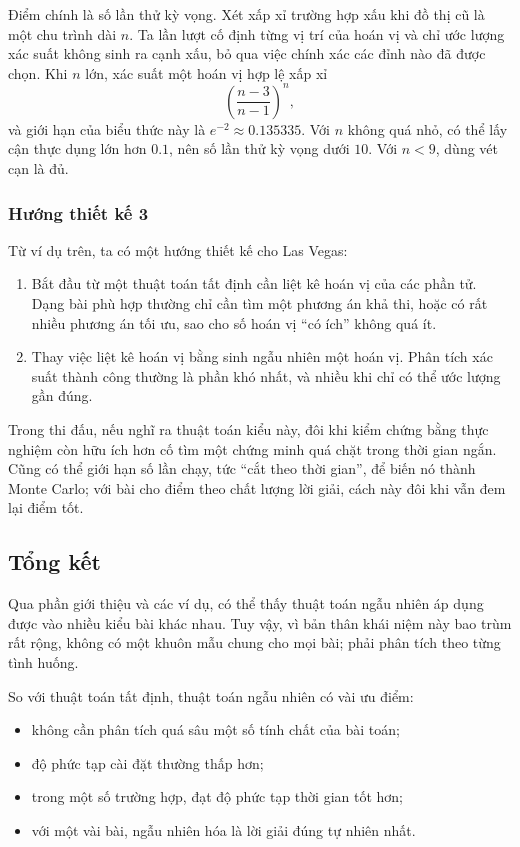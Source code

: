 \documentclass[11pt]{article}
\begin{document}
Điểm chính là số lần thử kỳ vọng. Xét xấp xỉ trường hợp xấu khi đồ thị cũ là
một chu trình dài \(n\). Ta lần lượt cố định từng vị trí của hoán vị và chỉ ước
lượng xác suất không sinh ra cạnh xấu, bỏ qua việc chính xác các đỉnh nào đã
được chọn. Khi \(n\) lớn, xác suất một hoán vị hợp lệ xấp xỉ
\[
  \left(\frac{n-3}{n-1}\right)^n,
\]
và giới hạn của biểu thức này là \(e^{-2}\approx0.135335\). Với \(n\) không quá
nhỏ, có thể lấy cận thực dụng lớn hơn \(0.1\), nên số lần thử kỳ vọng dưới
\(10\). Với \(n<9\), dùng vét cạn là đủ.

\subsubsection{Hướng thiết kế 3}

Từ ví dụ trên, ta có một hướng thiết kế cho Las Vegas:
\begin{enumerate}
  \item Bắt đầu từ một thuật toán tất định cần liệt kê hoán vị của các phần tử.
  Dạng bài phù hợp thường chỉ cần tìm một phương án khả thi, hoặc có rất nhiều
  phương án tối ưu, sao cho số hoán vị ``có ích'' không quá ít.
  \item Thay việc liệt kê hoán vị bằng sinh ngẫu nhiên một hoán vị. Phân tích
  xác suất thành công thường là phần khó nhất, và nhiều khi chỉ có thể ước lượng
  gần đúng.
\end{enumerate}

Trong thi đấu, nếu nghĩ ra thuật toán kiểu này, đôi khi kiểm chứng bằng thực
nghiệm còn hữu ích hơn cố tìm một chứng minh quá chặt trong thời gian ngắn. Cũng
có thể giới hạn số lần chạy, tức ``cắt theo thời gian'', để biến nó thành Monte
Carlo; với bài cho điểm theo chất lượng lời giải, cách này đôi khi vẫn đem lại
điểm tốt.

\subsection{Tổng kết}

Qua phần giới thiệu và các ví dụ, có thể thấy thuật toán ngẫu nhiên áp dụng được
vào nhiều kiểu bài khác nhau. Tuy vậy, vì bản thân khái niệm này bao trùm rất
rộng, không có một khuôn mẫu chung cho mọi bài; phải phân tích theo từng tình
huống.

So với thuật toán tất định, thuật toán ngẫu nhiên có vài ưu điểm:
\begin{itemize}
  \item không cần phân tích quá sâu một số tính chất của bài toán;
  \item độ phức tạp cài đặt thường thấp hơn;
  \item trong một số trường hợp, đạt độ phức tạp thời gian tốt hơn;
  \item với một vài bài, ngẫu nhiên hóa là lời giải đúng tự nhiên nhất.
\end{itemize}
\end{document}
